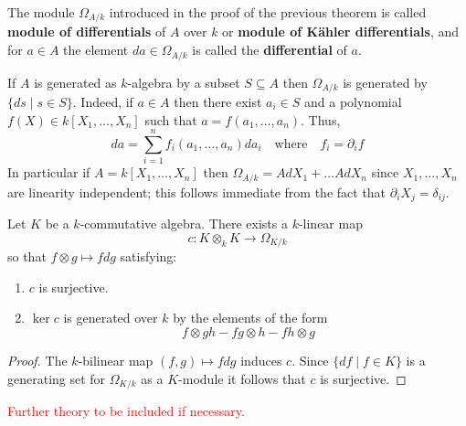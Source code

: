 \begin{definition}\label{def:module-of-differentials}
	The module $\Omega_{A/k}$ introduced in the proof of the previous theorem is called \textbf{module of differentials} of $A$ over $k$ or \textbf{module of Kähler differentials}, and for $a \in A$ the element $da\in \Omega_{A/k}$ is called the \textbf{differential} of $a$.
\end{definition}
\begin{example}\label{ex:differentials-of-polynomials}
	If $A$ is generated as $k$-algebra by a subset $S \subseteq A$ then $\Omega_{A/k}$ is generated by $\{ds\mid s \in S\}$. Indeed, if $a \in A$ then there exist $a_{i}\in S$ and a polynomial $f(X) \in k[X_{1}, \ldots, X_{n}]$ such that $a = f(a_{1}, \ldots, a_{n})$. Thus,
	\[
		da = \sum_{i=1}^{n} f_{i}(a_{1}, \ldots, a_{n})da_{i} \quad \text{where}\quad f_{i} = \partial_{i}f
	\]
	In particular if $A = k[X_{1}, \ldots, X_{n}]$ then $\Omega_{A/k} = A dX_{1} + \ldots A dX_{n}$ since $X_{1}, \ldots, X_{n}$ are linearity independent; this follows immediate from the fact that $\partial_{i} X_{j} = \delta_{ij}$.
\end{example}
\begin{lemma}\label{lemm:c-map-differentials}
	Let $K$ be a $k$-commutative algebra. There exists a $k$-linear map
	\[
		c\colon K \otimes_{k} K \to \Omega_{K/k}
	\]
	so that $f \otimes g \mapsto fdg$ satisfying:
	\begin{enumerate}[label = (\roman*)]
		\item $c$ is surjective.
		\item $\ker c$ is generated over $k$ by the elements of the form
		\[
			f \otimes gh - fg \otimes h - fh \otimes g
		\]
	\end{enumerate}
\end{lemma}
\begin{proof}
	The $k$-bilinear map $(f,g) \mapsto fdg$ induces $c$. Since $\{df \mid f\in K\}$ is a generating set for $\Omega_{K/k}$ as a $K$-module it follows that $c$ is surjective. 
\end{proof}


\textcolor{red}{Further theory to be included if necessary.}

